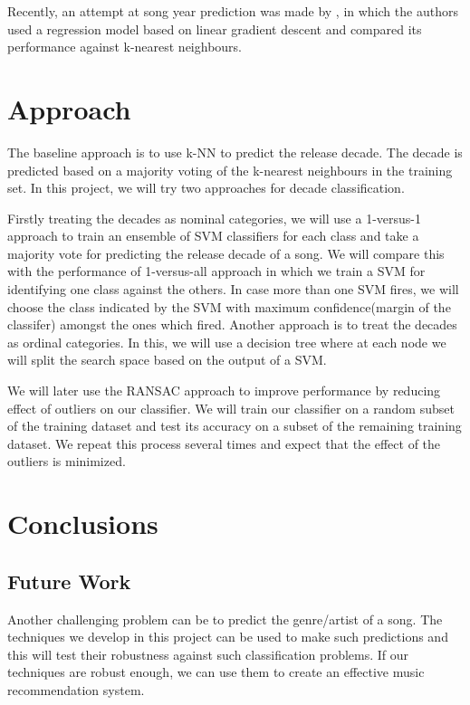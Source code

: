 \documentclass[twocolumn]{article}
\newcommand{\comment}[1]{}
\begin{document}
Recently, an attempt at song year prediction was made by \cite{millionsongs}, in which the authors used a regression model based on linear gradient descent and compared its performance against k-nearest neighbours.
\comment{

Can also comment out paragraphs, etc.

}

\section{Approach}

The baseline approach is to use k-NN to predict the release decade. The decade is predicted based on a majority voting of the k-nearest neighbours in the training set. In this project, we will try two approaches for decade classification. 

Firstly treating the decades as nominal categories, we will use a 1-versus-1 approach to train an ensemble of SVM classifiers for each class and take a majority vote for predicting the release decade of a song. We will compare this with the performance of 1-versus-all approach in which we train a SVM for identifying one class against the others. In case more than one SVM fires, we will choose the class indicated by the SVM with maximum confidence(margin of the classifer) amongst the ones which fired. Another approach is to treat the decades as ordinal categories. In this, we will use a decision tree where at each node we will split the search space based on the output of a SVM. 

We will later use the RANSAC approach \cite{ransac} to improve performance by reducing effect of outliers on our classifier. We will train our classifier on a random subset of the training dataset and test its accuracy on a subset of the remaining training dataset. We repeat this process several times and expect that the effect of the outliers is minimized. 
 

\section{Conclusions}
\subsection{Future Work}
Another challenging problem can be to predict the genre/artist of a song. The techniques we develop in this project can be used to make such predictions and this will test their robustness against such classification problems. If our techniques are robust enough, we can use them to create an effective music recommendation system. 
\end{document}
